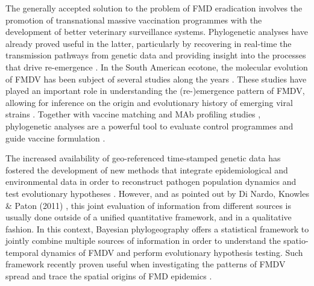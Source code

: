 \documentclass[10pt]{article}
\begin{document}
The generally accepted solution to the problem of FMD eradication involves the promotion of transnational massive vaccination programmes \cite{vaccinationSA}
with the development of better veterinary surveillance systems. Phylogenetic analyses have already proved useful in the latter, particularly by recovering in real-time the transmission pathways from genetic data \cite{cottam2008} and providing insight into the processes that drive re-emergence \cite{combining}.
In the South American ecotone, the molecular evolution of FMDV has been subject of several studies along the years \cite{Perez2001,Malirat2007,andean,Malirat2011,Maradei2013}.
These studies have played an important role in understanding the (re-)emergence pattern of FMDV, allowing for inference on the origin and evolutionary history of emerging viral strains \cite{topotypes,Perez2001}. Together with vaccine matching and MAb profiling studies \cite{Maradei2011}, phylogenetic analyses are a powerful 
tool to evaluate control programmes and guide vaccine formulation \cite{Maradei2011,Maradei2013}.

The increased availability of geo-referenced time-stamped genetic data has fostered the development of new methods that integrate epidemiological and environmental data in order to reconstruct pathogen population dynamics and test evolutionary hypotheses \cite{MEP,grenfell}. 
However, and as pointed out by Di Nardo, Knowles \&  Paton (2011) \cite{combining}, this joint evaluation of information from different sources is usually done outside of a unified quantitative framework, and in a qualitative fashion. In this context, Bayesian phylogeography offers a statistical framework to jointly combine multiple sources of information in order to understand the spatio-temporal dynamics of FMDV and perform evolutionary hypothesis testing. Such framework recently proven useful when investigating the patterns of FMDV spread and trace the spatial origins of FMD epidemics \cite{Carvalho2012,bulgaria,phymal}.
\end{document}
